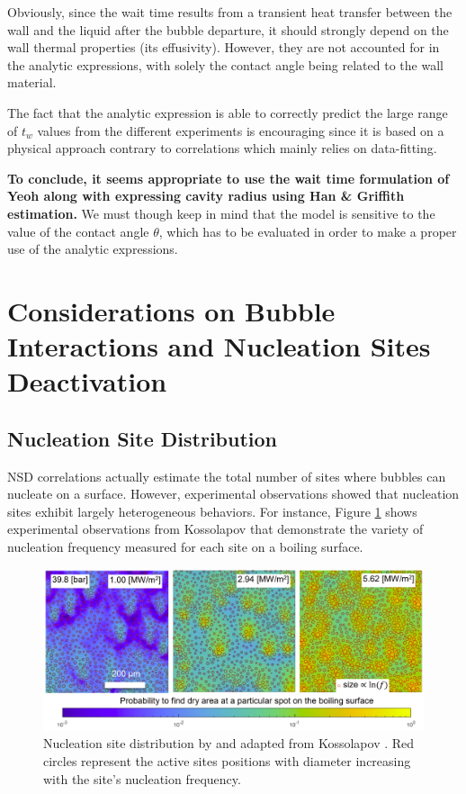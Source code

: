 \begin{remark*}{}
Obviously, since the wait time results from a transient heat transfer between the wall and the liquid after the bubble departure, it should strongly depend on the wall thermal properties (\eg its effusivity). However, they are not accounted for in the analytic expressions, with solely the contact angle being related to the wall material. 
\end{remark*}

The fact that the analytic expression is able to correctly predict the large range of $t_{w}$ values from the different experiments is encouraging since it is based on a physical approach contrary to correlations which mainly relies on data-fitting.

\npar
\textbf{To conclude, it seems appropriate to use the wait time formulation of Yeoh \etal along with expressing cavity radius using Han \& Griffith estimation.} We must though keep in mind that the model is sensitive to the value of the contact angle $\theta$, which has to be evaluated in order to make a proper use of the analytic expressions.


\section{Considerations on Bubble Interactions and Nucleation Sites Deactivation}
\label{sec:site_interactions}

\subsection{Nucleation Site Distribution}

NSD correlations actually estimate the total number of sites where bubbles can nucleate on a surface. However, experimental observations showed that nucleation sites exhibit largely heterogeneous behaviors. For instance, Figure \ref{fig:sites_f_koss} shows experimental observations from Kossolapov \cite{kossolapov_experimental_2021} that demonstrate the variety of nucleation frequency measured for each site on a boiling surface.

\begin{figure}[!h]
\centering
\includegraphics[width=0.9\linewidth]{img/site_interaction/site_f_kossolapov.PNG}
\caption{Nucleation site distribution by and adapted from Kossolapov \cite{kossolapov_experimental_2021}. Red circles represent the active sites positions with diameter increasing with the site's nucleation frequency.}
\label{fig:sites_f_koss}
\end{figure}

